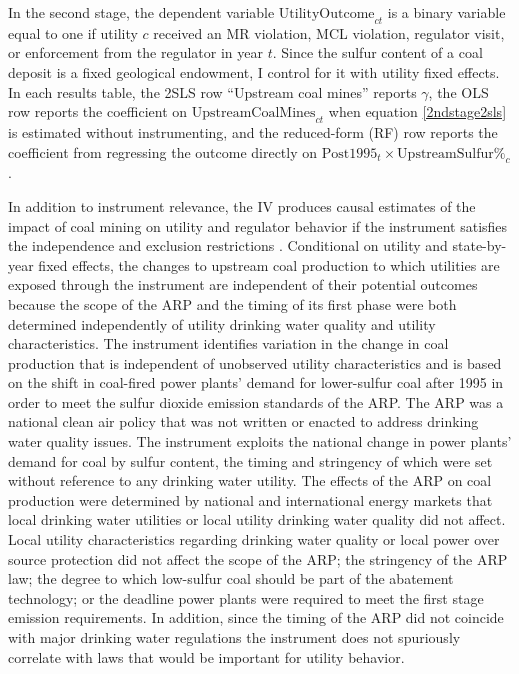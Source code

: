 \documentclass[12pt]{article}
\begin{document}
In the second stage, the dependent variable $\text{UtilityOutcome}_{ct}$ is a binary variable equal to one if utility $c$ received an MR violation, MCL violation, regulator visit, or enforcement from the regulator in year $t$. Since the sulfur content of a coal deposit is a fixed geological endowment, I control for it with utility fixed effects. In each results table, the 2SLS row ``Upstream coal mines'' reports $\gamma$, the OLS row reports the coefficient on $\text{UpstreamCoalMines}_{ct}$ when equation \ref{2ndstage2sls} is estimated without instrumenting, and the reduced-form (RF) row reports the coefficient from regressing the outcome directly on $\text{Post1995}_t \times \text{UpstreamSulfur\%}_c$.


In addition to instrument relevance, the IV produces causal estimates of the impact of coal mining on utility and regulator behavior if the instrument satisfies the independence and exclusion restrictions \parencite{angrist2009mostly}. Conditional on utility and state-by-year fixed effects, the changes to upstream coal production to which utilities are exposed through the instrument are independent of their potential outcomes because the scope of the ARP and the timing of its first phase were both determined independently of utility drinking water quality and utility characteristics. The instrument identifies variation in the change in coal production that is independent of unobserved utility characteristics and is based on the shift in coal-fired power plants' demand for lower-sulfur coal after 1995 in order to meet the sulfur dioxide emission standards of the ARP. The ARP was a national clean air policy that was not written or enacted to address drinking water quality issues. The instrument exploits the national change in power plants' demand for coal by sulfur content, the timing and stringency of which were set without reference to any drinking water utility. The effects of the ARP on coal production were determined by national and international energy markets that local drinking water utilities or local utility drinking water quality did not affect. Local utility characteristics regarding drinking water quality or local power over source protection did not affect the scope of the ARP; the stringency of the ARP law; the degree to which low-sulfur coal should be part of the abatement technology; or the deadline power plants were required to meet the first stage emission requirements. In addition, since the timing of the ARP did not coincide with major drinking water regulations the instrument does not spuriously correlate with laws that would be important for utility behavior.
\end{document}
